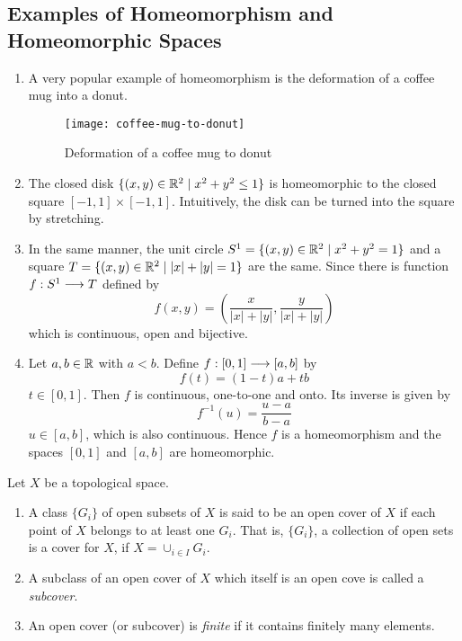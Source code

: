 \subsection{Examples of Homeomorphism and Homeomorphic Spaces}
\begin{enumerate}
    \item A very popular example of homeomorphism is the deformation of a coffee mug into a donut.
    \begin{figure}[H]
        \centering
        \texttt{[image: coffee-mug-to-donut]}
        \caption{Deformation of a coffee mug to donut}
    \end{figure}
    \item The closed disk $\{(x,y) \in \mathbb{R}^2 \mid x^2 + y^2 \le 1\}$ is homeomorphic to the closed square $[-1,1] \times [-1,1]$. Intuitively, the disk can be turned into the square by stretching.
    \item In the same manner, the unit circle $S^1 = \{(x,y) \in \mathbb{R}^2 \mid x^2 + y^2 = 1\}$ and a square $T = \{(x,y) \in \mathbb{R}^2 \mid |x| + |y| = 1\}$ are the same. Since there is function $f : S^1 \longrightarrow T$ defined by
    \[
        f(x,y) = \left(\frac{x}{|x| + |y|}, \frac{y}{|x| + |y|}\right)  
    \]
    which is continuous, open and bijective.
    \item Let $a,b \in \mathbb{R}$ with $a < b$. Define $f: [0,1] \longrightarrow [a,b]$ by 
    \[
        f(t) = (1-t)a + tb 
    \]
    $t \in [0,1]$. Then $f$ is continuous, one-to-one and onto. Its inverse is given by 
    \[
        f^{-1} (u) = \frac{u-a}{b-a}  
    \]
    $u \in [a,b]$, which is also continuous. Hence $f$ is a homeomorphism and the spaces $[0,1]$ and $[a,b]$ are homeomorphic.

\end{enumerate}

\begin{defn} 
    Let $X$ be a topological space.
    \begin{enumerate}
        \item A class $\{G_i\}$ of open subsets of $X$ is said to be an open cover of $X$ if each point of $X$ belongs to at least one $G_i$. That is, $\{G_i\}$, a collection of open sets is a cover for $X$, if $X = \cup_{i \in I} G_i$.
        \item A subclass of an open cover of $X$ which itself is an open cove is called a \textit{subcover}.
        \item An open cover (or subcover) is \textit{finite} if it contains finitely many elements.
    \end{enumerate}
\end{defn}

